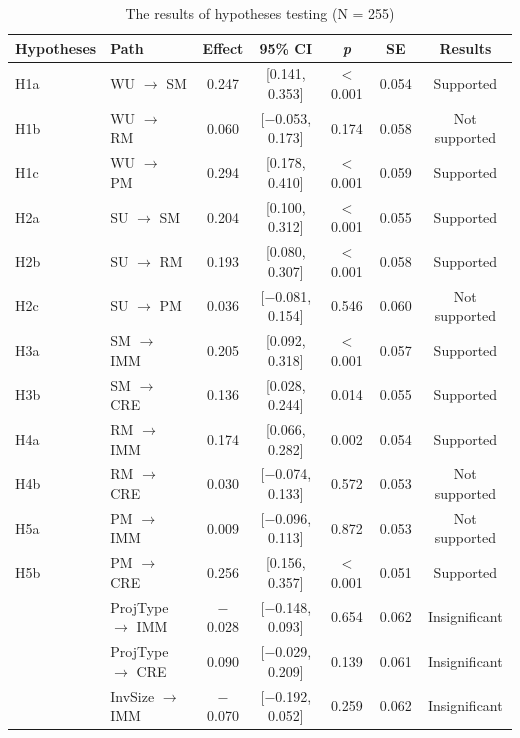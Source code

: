 \documentclass[authoryear,preprint,review,times,10pt]{elsarticle}
\begin{document}
\begin{table}[!htbp]
\centering
\captionsetup{font=normalsize, labelsep=period}
\setlength{\abovecaptionskip}{5pt}
\setlength{\belowcaptionskip}{0pt}
\caption{The results of hypotheses testing (N = 255)}
\label{tab:hypotheses}
\small
\begin{threeparttable}
\begin{tabular*}{0.9\textwidth}{@{\extracolsep{\fill}}llccccc}
\toprule
\textbf{Hypotheses} & \textbf{Path} & \textbf{Effect} & \textbf{95\% CI} & \textbf{\textit{p}} & \textbf{SE} & \textbf{Results} \\
\midrule
H1a & WU $\rightarrow$ SM  & 0.247 & [0.141, 0.353] & $<$0.001 & 0.054 & Supported \\
H1b & WU $\rightarrow$ RM  & 0.060  & [$-$0.053, 0.173] & 0.174 & 0.058 & Not supported \\
H1c & WU $\rightarrow$ PM  & 0.294  & [0.178, 0.410] & $<$0.001 & 0.059 & Supported \\
H2a & SU $\rightarrow$ SM  & 0.204  & [0.100, 0.312] & $<$0.001 & 0.055 & Supported \\
H2b & SU $\rightarrow$ RM  & 0.193  & [0.080, 0.307] & $<$0.001 & 0.058 & Supported \\
H2c & SU $\rightarrow$ PM  & 0.036  & [$-$0.081, 0.154] & 0.546 & 0.060 & Not supported \\
H3a & SM $\rightarrow$ IMM & 0.205  & [0.092, 0.318] & $<$0.001 & 0.057 & Supported \\
H3b & SM $\rightarrow$ CRE & 0.136  & [0.028, 0.244] & 0.014 & 0.055 & Supported \\
H4a & RM $\rightarrow$ IMM & 0.174  & [0.066, 0.282] & 0.002 & 0.054 & Supported \\
H4b & RM $\rightarrow$ CRE & 0.030  & [$-$0.074, 0.133] & 0.572 & 0.053 & Not supported \\
H5a & PM $\rightarrow$ IMM & 0.009  & [$-$0.096, 0.113] & 0.872 & 0.053 & Not supported \\
H5b & PM $\rightarrow$ CRE & 0.256  & [0.156, 0.357] & $<$0.001 & 0.051 & Supported \\
\midrule
 & ProjType $\rightarrow$ IMM & $-$0.028 & [$-$0.148, 0.093] & 0.654 & 0.062 & Insignificant \\
 & ProjType $\rightarrow$ CRE & 0.090   & [$-$0.029, 0.209] & 0.139 & 0.061 & Insignificant \\
 & InvSize $\rightarrow$ IMM  & $-$0.070 & [$-$0.192, 0.052] & 0.259 & 0.062 & Insignificant \\

\end{tabular*}
\end{threeparttable}
\end{table}
\end{document}

